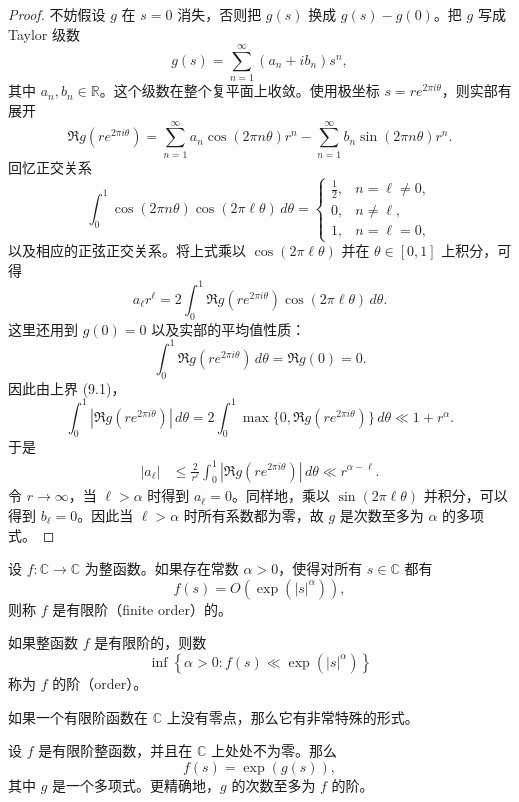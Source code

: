 \begin{proof}
	不妨假设 $g$ 在 $s=0$ 消失，否则把 $g(s)$ 换成 $g(s)-g(0)$。把 $g$ 写成 Taylor 级数
	\[
		g(s)=\sum_{n=1}^{\infty}(a_n+ib_n)s^n,
	\]
	其中 $a_n,b_n\in\mathbb R$。这个级数在整个复平面上收敛。使用极坐标
	$s=re^{2\pi i\theta}$，则实部有展开
	\[
		\Re g(re^{2\pi i\theta})
		=
		\sum_{n=1}^{\infty}a_n\cos(2\pi n\theta)r^n
		-
		\sum_{n=1}^{\infty}b_n\sin(2\pi n\theta)r^n.
	\]
	回忆正交关系
	\[
		\int_0^1
		\cos(2\pi n\theta)\cos(2\pi \ell\theta)\,d\theta
		=
		\begin{cases}
			\frac12, & n=\ell\neq0,\\
			0, & n\neq \ell,\\
			1, & n=\ell=0,
		\end{cases}
	\]
	以及相应的正弦正交关系。将上式乘以 $\cos(2\pi \ell\theta)$ 并在 $\theta\in[0,1]$ 上积分，可得
	\[
		a_\ell r^\ell
		=
		2\int_0^1
		\Re g(re^{2\pi i\theta})\cos(2\pi\ell\theta)\,d\theta.
	\]
	这里还用到 $g(0)=0$ 以及实部的平均值性质：
	\[
		\int_0^1 \Re g(re^{2\pi i\theta})\,d\theta=\Re g(0)=0.
	\]
	因此由上界 (9.1)，
	\[
		\int_0^1 |\Re g(re^{2\pi i\theta})|\,d\theta
		=
		2\int_0^1 \max\{0,\Re g(re^{2\pi i\theta})\}\,d\theta
		\ll
		1+r^\alpha.
	\]
	于是
	\[
	\begin{aligned}
		|a_\ell|
		&\leq
		\frac{2}{r^\ell}
		\int_0^1 |\Re g(re^{2\pi i\theta})|\,d\theta
		\ll
		r^{\alpha-\ell}.
	\end{aligned}
	\]
	令 $r\to\infty$，当 $\ell>\alpha$ 时得到 $a_\ell=0$。同样地，乘以 $\sin(2\pi\ell\theta)$ 并积分，可以得到 $b_\ell=0$。因此当 $\ell>\alpha$ 时所有系数都为零，故 $g$ 是次数至多为 $\alpha$ 的多项式。
\end{proof}

\begin{definition}[有限阶函数]
	设 $f:\mathbb C\to\mathbb C$ 为整函数。如果存在常数 $\alpha>0$，使得对所有 $s\in\mathbb C$ 都有
	\[
		f(s)=O\left(\exp(|s|^\alpha)\right),
	\]
	则称 $f$ 是有限阶（finite order）的。
\end{definition}

\begin{definition}[阶]
	如果整函数 $f$ 是有限阶的，则数
	\[
		\inf\left\{
		\alpha>0:
		f(s)\ll \exp(|s|^\alpha)
		\right\}
	\]
	称为 $f$ 的阶（order）。
\end{definition}

如果一个有限阶函数在 $\mathbb C$ 上没有零点，那么它有非常特殊的形式。

\begin{lemma}[原文 Lemma 9.2]
	设 $f$ 是有限阶整函数，并且在 $\mathbb C$ 上处处不为零。那么
	\[
		f(s)=\exp(g(s)),
	\]
	其中 $g$ 是一个多项式。更精确地，$g$ 的次数至多为 $f$ 的阶。
\end{lemma}

